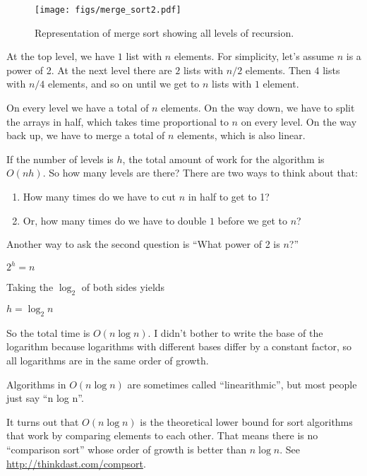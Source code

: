\documentclass[12pt]{book}
\theoremstyle{exercise}
\begin{document}
\begin{figure}
\centering
\texttt{[image: figs/merge\_sort2.pdf]}
\caption{Representation of merge sort showing all levels of recursion.}
\label{fig-sort2}
\end{figure}

At the top level, we have $1$ list with $n$ elements. 
For simplicity, let's assume $n$ is a power of 2.
At the next level there are $2$ lists with $n/2$ elements.
Then $4$ lists with $n/4$ elements, and so on until we get
to $n$ lists with $1$ element.

On every level we have a total of $n$ elements. On the way down,
we have to split the arrays in half, which takes time proportional to
$n$ on every level. On the way back up, we have to merge a total
of $n$ elements, which is also linear.

If the number of levels is $h$, the total amount of work for the
algorithm is $O(nh)$. So how many levels are there? There are two
ways to think about that:

\begin{enumerate}

\item
  How many times do we have to cut $n$ in half to get to 1?

\item
   Or, how many times do we have to double $1$ before we get to $n$?

\end{enumerate}

Another way to ask the second question is ``What power of 2 is
$n$?''

$2^h = n$

Taking the $\log_2$ of both sides yields

$h = \log_2 n$

So the total time is $O(n \log n)$. I didn't bother to write the
base of the logarithm because logarithms with different bases differ by
a constant factor, so all logarithms are in the same order of growth.


Algorithms in $O(n \log n)$ are sometimes called
``linearithmic'', but most people just say ``n log n''.


It turns out that $O(n \log n)$ is the theoretical lower bound for
sort algorithms that work by comparing elements to each other. That
means there is no ``comparison sort'' whose order of growth is better
than $n \log n$.  See \url{http://thinkdast.com/compsort}.
\end{document}
